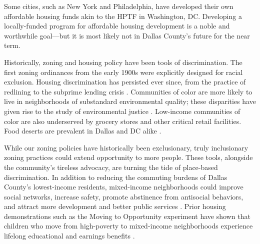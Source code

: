 \documentclass[paper=letter, fontsize=12pt]{scrartcl} %
\begin{document}
Some cities, such as New York and Philadelphia, have developed their own affordable housing funds akin to the HPTF in Washington, DC. Developing a locally-funded program for affordable housing development is a noble and worthwhile goal---but it is most likely not in Dallas County's future for the near term.\par

Historically, zoning and housing policy have been tools of discrimination. The first zoning ordinances from the early 1900s were explicitly designed for racial exclusion. Housing discrimination has persisted ever since, from the practice of redlining to the subprime lending crisis \cite{rothstein}. Communities of color are more likely to live in neighborhoods of substandard environmental quality; these disparities have given rise to the study of environmental justice \cite{bullard}. Low-income communities of color are also underserved by grocery stores and other critical retail facilities. Food deserts are prevalent in Dallas and DC alike \cite{wilonsky} \cite{sturdivant}.\par

While our zoning policies have historically been exclusionary, truly inclusionary zoning practices could extend opportunity to more people. These tools, alongside the community's tireless advocacy, are turning the tide of place-based discrimination. In addition to reducing the commuting burdens of Dallas County's lowest-income residents, mixed-income neighborhoods could improve social networks, increase safety, promote abstinence from antisocial behaviors, and attract more development and better public services \cite{silverman}. Prior housing demonstrations such as the Moving to Opportunity experiment have shown that children who move from high-poverty to mixed-income neighborhoods experience lifelong educational and earnings benefits \cite{briggs}.\par
\end{document}
